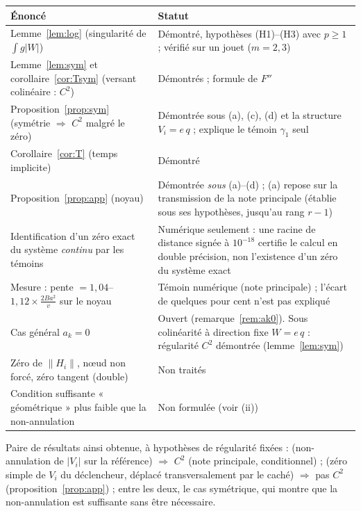 \documentclass[11pt,a4paper]{article}
\theoremstyle{remark}
\begin{document}
\begin{center}
\begin{tabular}{p{}p{}}
\toprule
Énoncé & Statut\\
\midrule
Lemme~\ref{lem:log} (singularité de $\int g\lvert W\rvert$) & Démontré, hypothèses (H1)--(H3) avec $p\ge1$ ; vérifié sur un jouet ($m=2,3$)\\
Lemme~\ref{lem:sym} et corollaire~\ref{cor:Tsym} (versant colinéaire : $C^2$) & Démontrés ; formule de $F''$ \\
Proposition~\ref{prop:sym} (symétrie $\Rightarrow$ $C^2$ malgré le zéro) & Démontrée sous (a), (c), (d) et la structure $V_i=e\,q$ ; explique le témoin $\gamma_1$ seul\\
Corollaire~\ref{cor:T} (temps implicite) & Démontré\\
Proposition~\ref{prop:app} (noyau) & Démontrée \emph{sous} (a)--(d) ; (a) repose sur la transmission de la note principale (établie sous ses hypothèses, jusqu'au rang $r-1$)\\
Identification d'un zéro exact du système \emph{continu} par les témoins & Numérique seulement : une racine de distance signée à $10^{-18}$ certifie le calcul en double précision, non l'existence d'un zéro du système exact\\
Mesure : pente $=1{,}04$--$1{,}12\times\frac{2Ba^2}v$ sur le noyau & Témoin numérique (note principale) ; l'écart de quelques pour cent n'est pas expliqué\\
Cas général $a_k=0$ & Ouvert (remarque~\ref{rem:ak0}). Sous colinéarité à direction fixe $W=e\,q$ : régularité $C^2$ démontrée (lemme~\ref{lem:sym})\\
Zéro de $\lVert H_i\rVert$, nœud non forcé, zéro tangent (double) & Non traités\\
Condition suffisante « géométrique » plus faible que la non-annulation & Non formulée (voir (ii))\\
\bottomrule
\end{tabular}
\end{center}

\noindent Paire de résultats ainsi obtenue, à hypothèses de régularité fixées : (non-annulation de $\lvert V_i\rvert$ sur la référence) $\Rightarrow$ $C^2$ (note principale, conditionnel) ; (zéro simple de $V_i$ du déclencheur, déplacé transversalement par le caché) $\Rightarrow$ pas $C^2$ (proposition~\ref{prop:app}) ; entre les deux, le cas symétrique, qui montre que la non-annulation est suffisante sans être nécessaire.
\end{document}
